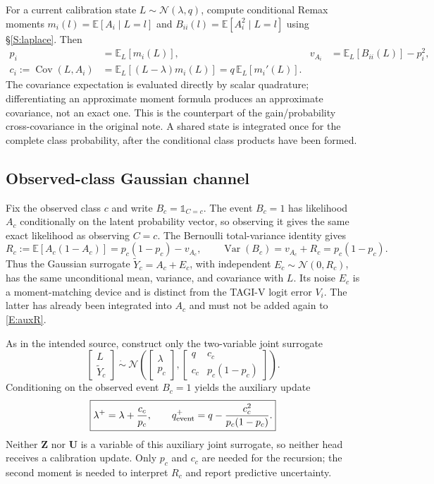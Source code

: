 \documentclass[letterpaper]{article}
\newcommand{\E}{\mathbb E}
\newcommand{\Var}{\operatorname{Var}}
\newcommand{\Cov}{\operatorname{Cov}}
\newcommand{\Normal}{\mathcal N}
\newcommand{\ind}{\mathbb 1}
\newcommand{\given}{\mid}
\begin{document}
For a current calibration state $L\sim\Normal(\lambda,q)$, compute conditional Remax moments $m_i(l)=\E[A_i\given L=l]$ and $B_{ii}(l)=\E[A_i^2\given L=l]$ using \S\ref{S:laplace}. Then
\begin{align}
p_i&=\E_L[m_i(L)],&v_{A_i}&=\E_L[B_{ii}(L)]-p_i^2,\\
c_i:=\Cov(L,A_i)&=\E_L[(L-\lambda)m_i(L)]
=q\,\E_L[m_i'(L)].
\label{E:auxmoments}
\end{align}
The covariance expectation is evaluated directly by scalar quadrature; differentiating an approximate moment formula produces an approximate covariance, not an exact one. This is the counterpart of the gain/probability cross-covariance in the original note. A shared state is integrated once for the complete class probability, after the conditional class products have been formed.

\subsection{Observed-class Gaussian channel}
Fix the observed class $c$ and write $B_c=\ind_{C=c}$. The event $B_c=1$ has likelihood $A_c$ conditionally on the latent probability vector, so observing it gives the same exact likelihood as observing $C=c$. The Bernoulli total-variance identity gives
\begin{equation}
R_c:=\E[A_c(1-A_c)]=p_c(1-p_c)-v_{A_c},\qquad
\Var(B_c)=v_{A_c}+R_c=p_c(1-p_c).
\label{E:auxR}
\end{equation}
Thus the Gaussian surrogate $\widetilde Y_c=A_c+E_c$, with independent $E_c\sim\Normal(0,R_c)$, has the same unconditional mean, variance, and covariance with $L$. Its noise $E_c$ is a moment-matching device and is distinct from the TAGI-V logit error $V_i$. The latter has already been integrated into $A_c$ and must not be added again to \eqref{E:auxR}.

As in the intended source, construct only the two-variable joint surrogate
\begin{equation}
\begin{bmatrix}L\\\widetilde Y_c\end{bmatrix}\ \dot\sim\ \Normal\!\left(
\begin{bmatrix}\lambda\\p_c\end{bmatrix},
\begin{bmatrix}q&c_c\\c_c&p_c(1-p_c)\end{bmatrix}\right).
\end{equation}
Conditioning on the observed event $B_c=1$ yields the auxiliary update
\begin{equation}
\boxed{\lambda^+=\lambda+\frac{c_c}{p_c},\qquad
q^+_{\rm event}=q-\frac{c_c^2}{p_c(1-p_c)}.}
\label{E:auxupdate}
\end{equation}
Neither $\bm Z$ nor $\bm U$ is a variable of this auxiliary joint surrogate, so neither head receives a calibration update. Only $p_c$ and $c_c$ are needed for the recursion; the second moment is needed to interpret $R_c$ and report predictive uncertainty.
\end{document}
